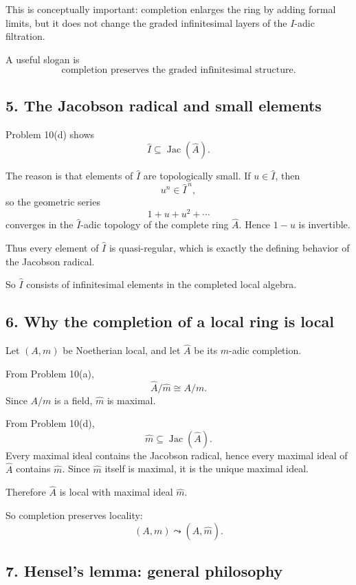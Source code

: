 \documentclass[12pt,a4paper]{article}
\theoremstyle{plain}
\theoremstyle{definition}      %
\begin{document}
	This is conceptually important: completion enlarges the ring by adding formal limits, but it does not change the graded infinitesimal layers of the \(I\)-adic filtration.
	
	A useful slogan is
	\[
	\boxed{\text{completion preserves the graded infinitesimal structure.}}
	\]
	
	\subsection*{5. The Jacobson radical and small elements}
	
	Problem 10(d) shows
	\[
	\widehat I\subseteq \operatorname{Jac}(\widehat A).
	\]
	
	The reason is that elements of \(\widehat I\) are topologically small. If \(u\in \widehat I\), then
	\[
	u^n\in \widehat I^{\,n},
	\]
	so the geometric series
	\[
	1+u+u^2+\cdots
	\]
	converges in the \(\widehat I\)-adic topology of the complete ring \(\widehat A\). Hence \(1-u\) is invertible.
	
	Thus every element of \(\widehat I\) is quasi-regular, which is exactly the defining behavior of the Jacobson radical.
	
	So \(\widehat I\) consists of infinitesimal elements in the completed local algebra.
	
	\subsection*{6. Why the completion of a local ring is local}
	
	Let \((A,m)\) be Noetherian local, and let \(\widehat A\) be its \(m\)-adic completion.
	
	From Problem 10(a),
	\[
	\widehat A/\widehat m \cong A/m.
	\]
	Since \(A/m\) is a field, \(\widehat m\) is maximal.
	
	From Problem 10(d),
	\[
	\widehat m\subseteq \operatorname{Jac}(\widehat A).
	\]
	Every maximal ideal contains the Jacobson radical, hence every maximal ideal of \(\widehat A\) contains \(\widehat m\). Since \(\widehat m\) itself is maximal, it is the unique maximal ideal.
	
	Therefore \(\widehat A\) is local with maximal ideal \(\widehat m\).
	
	So completion preserves locality:
	\[
	(A,m)\leadsto (\widehat A,\widehat m).
	\]
	
	\subsection*{7. Hensel's lemma: general philosophy}
	
\end{document}
